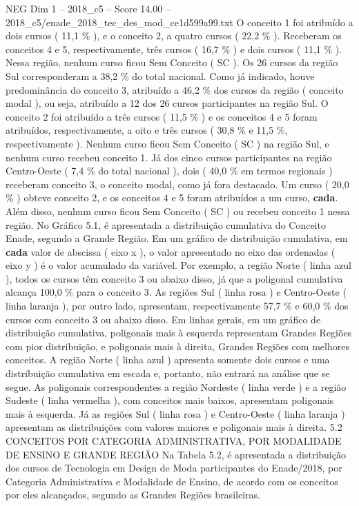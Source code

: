 \begin{textsample}{NEG Dim 1 – 2018\_c5 – Score 14.00 – 2018\_c5/enade\_2018\_tec\_des\_mod\_ce1d599a99.txt}
O conceito 1 foi atribuído a dois cursos ( 11,1 \% ), e o conceito 2, a quatro cursos ( 22,2 \% ).
Receberam os conceitos 4 e 5, respectivamente, três cursos ( 16,7 \% ) e dois cursos ( 11,1 \% ).
Nessa região, nenhum curso ficou Sem Conceito ( SC ).
Os 26 cursos da região Sul corresponderam a 38,2 \% do total nacional.
Como já indicado, houve predominância do conceito 3, atribuído a 46,2 \% dos cursos da região ( conceito modal ), ou seja, atribuído a 12 dos 26 cursos participantes na região Sul.
O conceito 2 foi atribuído a três cursos ( 11,5 \% ) e os conceitos 4 e 5 foram atribuídos, respectivamente, a oito e três cursos ( 30,8 \% e 11,5 \%, respectivamente ).
Nenhum curso ficou Sem Conceito ( SC ) na região Sul, e nenhum curso recebeu conceito 1.
Já dos cinco cursos participantes na região Centro-Oeste ( 7,4 \% do total nacional ), dois ( 40,0 \% em termos regionais ) receberam conceito 3, o conceito modal, como já fora destacado.
Um curso ( 20,0 \% ) obteve conceito 2, e os conceitos 4 e 5 foram atribuídos a um curso, \textbf{cada}.
Além disso, nenhum curso ficou Sem Conceito ( SC ) ou recebeu conceito 1 nessa região.
No Gráfico 5.1, é apresentada a distribuição cumulativa do Conceito Enade, segundo a Grande Região.
Em um gráfico de distribuição cumulativa, em \textbf{cada} valor de abscissa ( eixo x ), o valor apresentado no eixo das ordenadas ( eixo y ) é o valor acumulado da variável.
Por exemplo, a região Norte ( linha azul ), todos os cursos têm conceito 3 ou abaixo disso, já que a poligonal cumulativa alcança 100,0 \% para o conceito 3.
As regiões Sul ( linha rosa ) e Centro-Oeste ( linha laranja ), por outro lado, apresentam, respectivamente 57,7 \% e 60,0 \% dos cursos com conceito 3 ou abaixo disso.
Em linhas gerais, em um gráfico de distribuição cumulativa, poligonais mais à esquerda representam Grandes Regiões com pior distribuição, e poligonais mais à direita, Grandes Regiões com melhores conceitos.
A região Norte ( linha azul ) apresenta somente dois cursos e uma distribuição cumulativa em escada e, portanto, não entrará na análise que se segue.
As poligonais correspondentes a região Nordeste ( linha verde ) e a região Sudeste ( linha vermelha ), com conceitos mais baixos, apresentam poligonais mais à esquerda.
Já as regiões Sul ( linha rosa ) e Centro-Oeste ( linha laranja ) apresentam as distribuições com valores maiores e poligonais mais à direita. 5.2 CONCEITOS POR CATEGORIA ADMINISTRATIVA, POR MODALIDADE DE ENSINO E GRANDE REGIÃO Na Tabela 5.2, é apresentada a distribuição dos cursos de Tecnologia em Design de Moda participantes do Enade/2018, por Categoria Administrativa e Modalidade de Ensino, de acordo com os conceitos por eles alcançados, segundo as Grandes Regiões brasileiras.

\end{textsample}
